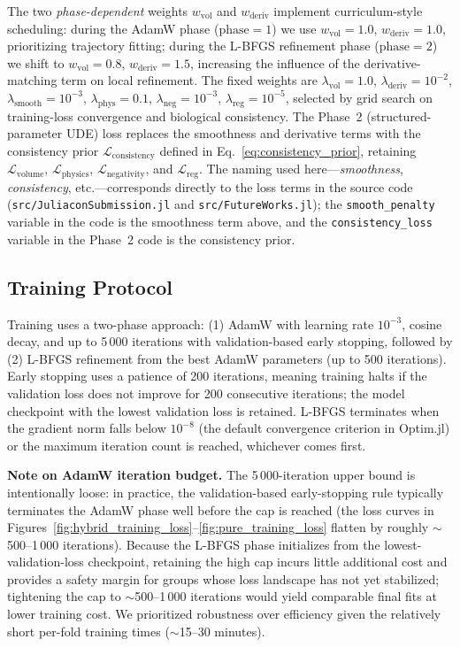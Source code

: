 \documentclass{juliacon}
\begin{document}
The two \emph{phase-dependent} weights $w_{\text{vol}}$ and $w_{\text{deriv}}$ implement curriculum-style scheduling: during the AdamW phase ($\text{phase}=1$) we use $w_{\text{vol}}=1.0$, $w_{\text{deriv}}=1.0$, prioritizing trajectory fitting; during the L-BFGS refinement phase ($\text{phase}=2$) we shift to $w_{\text{vol}}=0.8$, $w_{\text{deriv}}=1.5$, increasing the influence of the derivative-matching term on local refinement. The fixed weights are $\lambda_{\text{vol}}=1.0$, $\lambda_{\text{deriv}}=10^{-2}$, $\lambda_{\text{smooth}}=10^{-3}$, $\lambda_{\text{phys}}=0.1$, $\lambda_{\text{neg}}=10^{-3}$, $\lambda_{\text{reg}}=10^{-5}$, selected by grid search on training-loss convergence and biological consistency. The Phase~2 (structured-parameter UDE) loss replaces the smoothness and derivative terms with the consistency prior $\mathcal{L}_{\text{consistency}}$ defined in Eq.~\ref{eq:consistency_prior}, retaining $\mathcal{L}_{\text{volume}}$, $\mathcal{L}_{\text{physics}}$, $\mathcal{L}_{\text{negativity}}$, and $\mathcal{L}_{\text{reg}}$. The naming used here---\emph{smoothness}, \emph{consistency}, etc.---corresponds directly to the loss terms in the source code (\texttt{src/JuliaconSubmission.jl} and \texttt{src/FutureWorks.jl}); the \texttt{smooth\_penalty} variable in the code is the smoothness term above, and the \texttt{consistency\_loss} variable in the Phase~2 code is the consistency prior.

\subsection{Training Protocol}

Training uses a two-phase approach: (1) AdamW with learning rate $10^{-3}$, cosine decay, and up to 5\,000 iterations with validation-based early stopping, followed by (2) L-BFGS refinement from the best AdamW parameters (up to 500 iterations). Early stopping uses a patience of 200 iterations, meaning training halts if the validation loss does not improve for 200 consecutive iterations; the model checkpoint with the lowest validation loss is retained. L-BFGS terminates when the gradient norm falls below $10^{-8}$ (the default convergence criterion in Optim.jl) or the maximum iteration count is reached, whichever comes first.

\textbf{Note on AdamW iteration budget.} The 5\,000-iteration upper bound is intentionally loose: in practice, the validation-based early-stopping rule typically terminates the AdamW phase well before the cap is reached (the loss curves in Figures~\ref{fig:hybrid_training_loss}--\ref{fig:pure_training_loss} flatten by roughly $\sim$500--1\,000 iterations). Because the L-BFGS phase initializes from the lowest-validation-loss checkpoint, retaining the high cap incurs little additional cost and provides a safety margin for groups whose loss landscape has not yet stabilized; tightening the cap to $\sim$500--1\,000 iterations would yield comparable final fits at lower training cost. We prioritized robustness over efficiency given the relatively short per-fold training times ($\sim$15--30 minutes).
\end{document}
